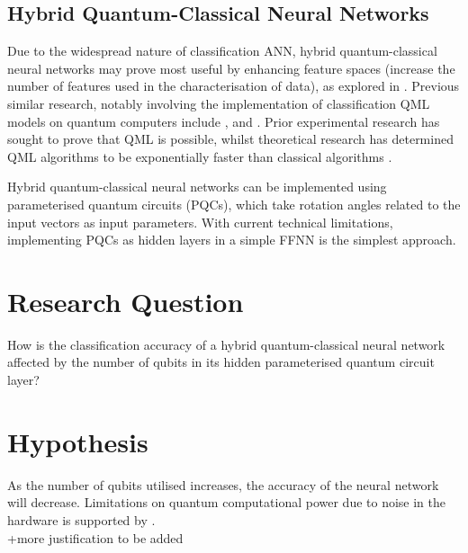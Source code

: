\documentclass[12pt, a4paper]{article}
\begin{document}
\subsection{Hybrid Quantum-Classical Neural Networks}
Due to the widespread nature of classification ANN, hybrid quantum-classical neural networks may prove most useful by enhancing feature spaces (increase the number of features used in the characterisation of data), as explored in \citep{Havlicek2019a}. Previous similar research, notably involving the implementation of classification QML models on quantum computers include \citep{Schuld2017}, \citep{Grant2018} and \citep{Tacchino2019}. Prior experimental research has sought to prove that QML is possible, whilst theoretical research has determined QML algorithms to be exponentially faster than classical algorithms \citep{Lloyd2013}.

Hybrid quantum-classical neural networks can be implemented using parameterised quantum circuits (PQCs), which take rotation angles related to the input vectors as input parameters. With current technical limitations, implementing PQCs as hidden layers in a simple FFNN is the simplest approach.

\newpage
\section{Research Question}
How is the classification accuracy of a hybrid quantum-classical neural network affected by the number of qubits in its hidden parameterised quantum circuit layer?

\section{Hypothesis}
As the number of qubits utilised increases, the accuracy of the neural network will decrease. Limitations on quantum computational power due to noise in the hardware is supported by \citep{preskill}.
\\+more justification to be added
\end{document}
